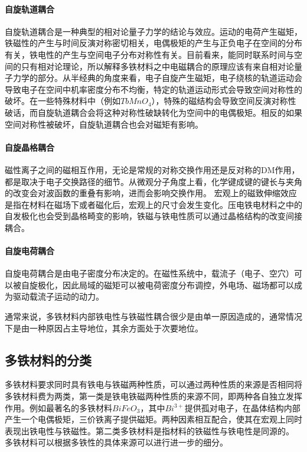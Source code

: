 \paragraph{自旋轨道耦合}
自旋轨道耦合是一种典型的相对论量子力学的结论与效应。运动的电荷产生磁矩，铁磁性的产生与时间反演对称密切相关，电偶极矩的产生与正负电子在空间的分布有关，铁电性的产生与空间电子分布对称性有关。目前看来，能同时联系时间与空间的只有相对论理论，所以解释多铁材料之中电磁耦合的原理应该有来自相对论量子力学的部分。从半经典的角度来看，电子自旋产生磁矩，电子绕核的轨道运动会导致电子在空间中机率密度分布不均衡，特定的轨道运动形式会导致空间对称性的破坏。在一些特殊材料中（例如$TbMnO_{4}$），特殊的磁结构会导致空间反演对称性破话，而自旋轨道耦合会将这种对称性破缺转化为空间中的电偶极矩。相反的如果空间对称性被破坏，自旋轨道耦合也会对磁矩有影响。

\paragraph{自旋晶格耦合}
磁性离子之间的磁相互作用，无论是常规的对称交换作用还是反对称的DM作用，都是取决于电子交换路径的细节。从微观分子角度上看，化学键成键的键长与夹角的改变会对波函数的重叠有影响，进而会影响交换作用。\cite{moriya1960anisotropic}
宏观上的磁致伸缩效应是指在材料在磁场下或者磁化后，宏观上的尺寸会发生变化。压电铁电材料之中的自发极化也会受到晶格畸变的影响，铁磁与铁电性质可以通过晶格结构的改变间接耦合。

\paragraph{自旋电荷耦合}
自旋电荷耦合是由电子密度分布决定的。在磁性系统中，载流子（电子、空穴）可以被自旋极化，因此局域的磁矩可以被电荷密度分布调控，外电场、磁场都可以成为驱动载流子运动的动力。

通常来说，多铁材料内部铁电性与铁磁性耦合很少是由单一原因造成的，通常情况下是由一种原因占主导地位，其余方面处于次要地位。

\subsection{多铁材料的分类}

多铁材料要求同时具有铁电与铁磁两种性质，可以通过两种性质的来源是否相同将多铁材料费为两类，第一类是铁电铁磁两种性质的来源不同，即两种各自独立发挥作用。例如最著名的多铁材料$BiFeO_{3}$\cite{姚携菲2014磁电多铁性材料的宠儿}，其中$Bi^{3+}$提供孤对电子，在晶体结构内部产生一个电偶极矩，三价铁离子提供磁矩。两种因素相互配合，使其在宏观上同时表现出铁电性与铁磁性。第二类多铁材料是指材料的铁磁性与铁电性是同源的。\cite{段纯刚2009磁电效应研究进展} 多铁材料可以根据多铁性的具体来源可以进行进一步的细分。



